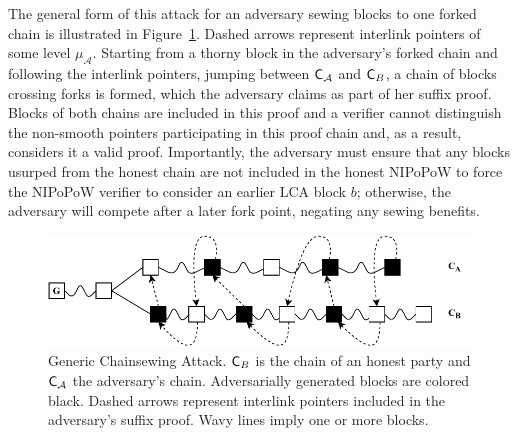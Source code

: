 The general form of this attack for an adversary sewing blocks to one forked chain is illustrated in Figure~\ref{fig:generic_attack}. Dashed arrows represent interlink pointers of some level $\mu_\mathcal{A}$. Starting from a thorny block in the adversary's forked chain and following the interlink pointers, jumping between $\mathsf{C}_\mathcal{A}$ and $\mathsf{C}_B$, a chain of blocks crossing forks is formed, which the adversary claims as part of her suffix proof. Blocks of both chains are included in this proof and a verifier cannot distinguish the non-smooth pointers participating in this proof chain and, as a result, considers it a valid proof. Importantly, the adversary must ensure that any blocks usurped from the honest chain are not included in the honest NIPoPoW to force the NIPoPoW verifier to consider an earlier LCA block $b$; otherwise, the adversary will compete after a later fork point, negating any sewing benefits.

\begin{figure}[h]
	\begin{center}
		\includegraphics[width=0.95\columnwidth
		]{figures/generic_chainsewing_attack.pdf}
	\end{center}
	\caption{Generic Chainsewing Attack. $\mathsf{C}_B$ is the chain of an honest party and $\mathsf{C}_\mathcal{A}$ the adversary's chain. Adversarially generated blocks are 	colored black. Dashed arrows represent interlink pointers included in the	adversary's suffix proof. Wavy lines imply one or more blocks.}
	\label{fig:generic_attack}
\end{figure}

